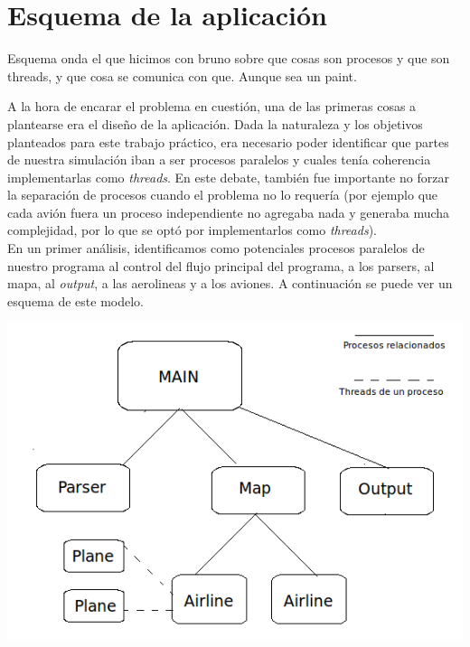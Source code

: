 \documentclass[a4paper,10pt]{article}
\begin{document}
\newpage
\section{Esquema de la aplicación}
Esquema onda el que hicimos con bruno sobre que cosas son procesos y que son threads, y que cosa se comunica con que. Aunque sea un paint.

A la hora de encarar el problema en cuestión, una de las primeras cosas a plantearse era el diseño de la aplicación. Dada la naturaleza y los objetivos planteados para este
 trabajo práctico, era necesario poder identificar que partes de nuestra simulación iban a ser procesos paralelos y cuales tenía coherencia implementarlas como \textit{threads}.
  En este debate, también fue importante no forzar la separación de procesos cuando el problema no lo requería (por ejemplo que cada avión fuera un proceso independiente no agregaba 
  nada y generaba mucha complejidad, por lo que se optó por implementarlos como \textit{threads}).\\ 

En un primer análisis, identificamos como potenciales procesos paralelos de nuestro programa al control del flujo principal del programa, a los parsers, al mapa, al \textit{output},
 a las aerolineas y
 a los aviones. A continuación se puede ver un esquema de este modelo.\\

\begin{center}
 \includegraphics{./images/Diagrama_simulacion_2.png}
\end{center}
\end{document}

